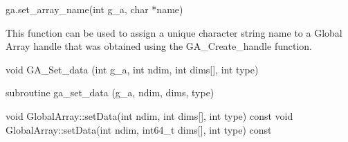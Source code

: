 \documentclass[10pt]{article}
\begin{document}
\begin{pyapi}
\begin{pycode}
ga.set_array_name(int g_a, char *name)
\end{pycode}
\begin{funcargs}
\end{funcargs}
\end{pyapi}

\gcoll

\begin{desc}

This function can be used to assign a unique character string name to a Global
Array handle that was obtained using the GA_Create_handle function.

\end{desc}



\begin{capi}
\begin{ccode}
void GA_Set_data (int g_a, int ndim, int dims[], int type)
\end{ccode}
\begin{funcargs}
\end{funcargs}
\end{capi}

\begin{fapi}
\begin{fcode}
subroutine ga_set_data (g_a, ndim, dims, type)
\end{fcode}
\begin{funcargs}
\end{funcargs}
\end{fapi}

\begin{cxxapi}
\begin{cxxcode}
void GlobalArray::setData(int ndim, int dims[], int type) const
void GlobalArray::setData(int ndim, int64_t dims[], int type) const
\end{cxxcode}
\begin{funcargs}
\end{funcargs}
\end{cxxapi}
\end{document}
